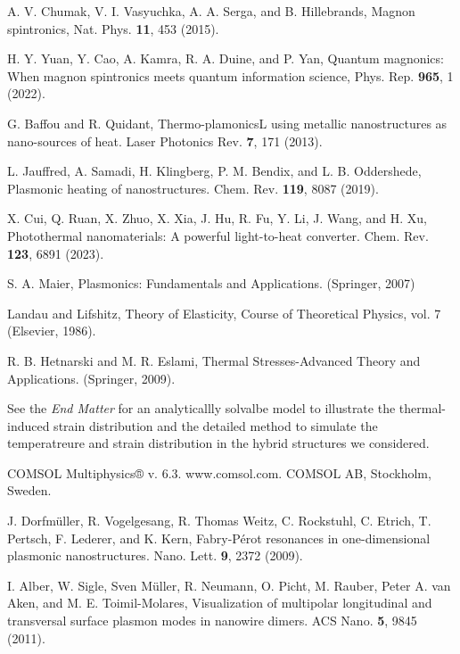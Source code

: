 \documentclass[aps,prl,reprint,floatfix,longbibliography,twocolumn]{revtex4-2}
\begin{document}
\begin{thebibliography}{}
 A. V. Chumak, V. I. Vasyuchka, A. A. Serga, and B. Hillebrands, Magnon spintronics, Nat. Phys. \textbf{11}, 453 (2015).

  H. Y. Yuan, Y. Cao, A. Kamra, R. A. Duine, and P. Yan, Quantum magnonics: When magnon spintronics meets
quantum information science, Phys. Rep. \textbf{965}, 1 (2022).





 G. Baffou and R. Quidant, Thermo-plamonicsL using metallic nanostructures as nano-sources of heat. Laser Photonics Rev. \textbf{7}, 171 (2013).

 L. Jauffred, A. Samadi, H. Klingberg, P. M. Bendix, and L. B. Oddershede, Plasmonic heating of nanostructures.
Chem. Rev. \textbf{119}, 8087 (2019).

 X. Cui, Q. Ruan, X. Zhuo, X. Xia, J. Hu, R. Fu, Y. Li, J. Wang, and H. Xu, Photothermal nanomaterials: A powerful light-to-heat converter. Chem. Rev. \textbf{123}, 6891 (2023).

 S. A. Maier, Plasmonics: Fundamentals and Applications. (Springer, 2007)

 Landau and Lifshitz, Theory of Elasticity, Course of Theoretical Physics, vol. 7 (Elsevier, 1986).


 R. B. Hetnarski and M. R. Eslami, Thermal Stresses-Advanced Theory and Applications. (Springer, 2009).

 See the \textit{End Matter} for an analyticallly solvalbe model to illustrate the thermal-induced strain distribution and the detailed method to simulate the temperatreure and strain distribution in the hybrid structures we considered.

 COMSOL Multiphysics® v. 6.3. www.comsol.com. COMSOL AB, Stockholm, Sweden.

 J. Dorfm\"{u}ller, R. Vogelgesang, R. Thomas Weitz, C. Rockstuhl,
C. Etrich, T. Pertsch, F. Lederer, and K. Kern, Fabry-P\'{e}rot resonances in one-dimensional plasmonic nanostructures. Nano. Lett.
\textbf{9}, 2372 (2009).

 I. Alber, W. Sigle, Sven M\"{u}ller, R. Neumann, O. Picht, M. Rauber,
Peter A. van Aken, and M. E. Toimil-Molares, Visualization of multipolar
longitudinal and transversal surface plasmon modes in nanowire dimers. ACS Nano. \textbf{5}, 9845 (2011).


\end{thebibliography}
\end{document}
